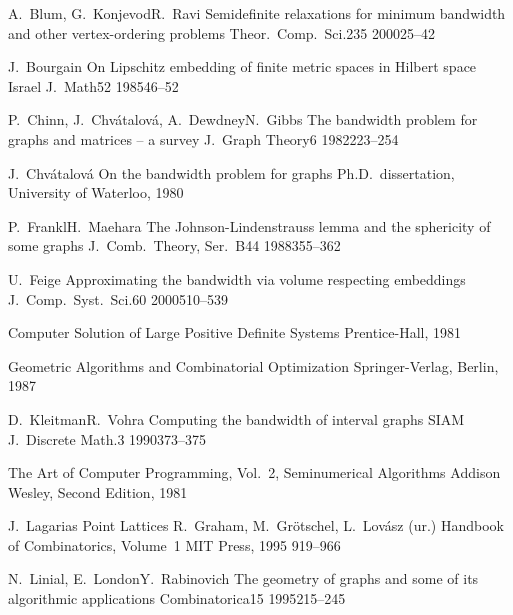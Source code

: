 \documentclass[12pt,a4paper,titlepage,openany]{report}
\begin{document}
 \begin{thebibliography}{99}
\thispagestyle{fancy}

  \clanekVRevijiVecAvtorjev
    {A.~Blum, G.~Konjevod}{R.~Ravi}
    {Semidefinite relaxations for minimum bandwidth and other vertex-ordering problems}
   {Theor.~Comp.~Sci.}{235}
   {2000}{25--42}

  \clanekVRevijiEnAvtor
    {J.~Bourgain}
    {On Lipschitz embedding of finite metric spaces in Hilbert space}
   {Israel J.~Math}{52}
   {1985}{46--52}

  \clanekVRevijiVecAvtorjev
    {P.~Chinn, J.~Chv\'atalov\'a, A.~Dewdney}{N.~Gibbs}
    {The bandwidth problem for graphs and matrices -- a survey}
   {J.~Graph Theory}{6}
   {1982}{223--254}

\doktorskaDisertacija
    {J.~Chv\'atalov\'a}
    {On the bandwidth problem for graphs}
    {Ph.D.~dissertation, University of Waterloo, 1980}

  \clanekVRevijiVecAvtorjev
    {P.~Frankl}{H.~Maehara}
    {The Johnson-Lindenstrauss lemma and the sphericity of some graphs}
   {J.~Comb.~Theory, Ser.~B}{44}
   {1988}{355--362}

  \clanekVRevijiEnAvtor
    {U.~Feige}
    {Approximating the bandwidth via volume respecting embeddings}
    {J.~Comp.~Syst.~Sci.}{60}
    {2000}{510--539}

   {Computer Solution of Large Positive Definite Systems}
    {Prentice-Hall, 1981}

   {Geometric Algorithms and Combinatorial Optimization}
    {Springer-Verlag, Berlin, 1987}

   \clanekVRevijiVecAvtorjev
     {D.~Kleitman}{R.~Vohra}
     {Computing the bandwidth of interval graphs}
     {SIAM J.~Discrete Math.}{3}
     {1990}{373--375}

   {The Art of Computer Programming, Vol.~2, Seminumerical Algorithms}
    {Addison Wesley, Second Edition, 1981}

\poglavjeVKnjigiEnAvtor
   {J.~Lagarias}
   {Point Lattices}
   {R.~Graham, M.~Gr\"otschel, L.~Lov\'asz (ur.)}
   {Handbook of Combinatorics, Volume~1}
   {MIT Press, 1995}
   {919--966}

   \clanekVRevijiVecAvtorjev
     {N.~Linial, E.~London}{Y.~Rabinovich}
   {The geometry of graphs and some of its algorithmic applications}
     {Combinatorica}{15}
     {1995}{215--245}


\end{thebibliography}
\end{document}
